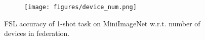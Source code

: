 \begin{itemize}[leftmargin=*]
\end{itemize}


\begin{figure}[t]
\centering
\begin{subfigure}{.46\textwidth}
\texttt{[image: figures/device\_num.png]}
\end{subfigure}
\vspace{-8pt}
\caption{FSL accuracy of 1-shot task on MiniImageNet w.r.t. number of devices in federation.}
\vspace{-8pt}
\label{fig:device_number}
\end{figure}








